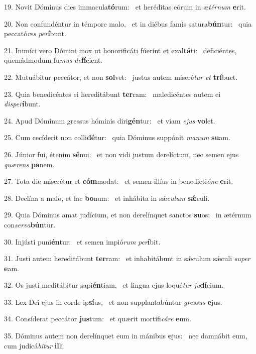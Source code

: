 19. Novit Dóminus dies immacula\textbf{tó}rum: \ast\  et heréditas eórum in æ\textit{tér}\textit{num} \textbf{e}rit.\

20. Non confundéntur in témpore malo, \dag\  et in diébus famis satura\textbf{bún}tur: \ast\  quia peccató\textit{res} \textit{per}\textbf{í}bunt.\

21. Inimíci vero Dómini mox ut honorificáti fúerint et exal\textbf{tá}ti: \ast\  deficiéntes, quemádmodum fu\textit{mus} \textit{de}\textbf{fí}cient.\

22. Mutuábitur peccátor, et non \textbf{sol}vet: \ast\  justus autem miseré\textit{tur} \textit{et} \textbf{trí}buet.\

23. Quia benedicéntes ei hereditábunt \textbf{ter}ram: \ast\  maledicéntes autem ei \textit{dis}\textit{per}\textbf{í}bunt.\

24. Apud Dóminum gressus hóminis diri\textbf{gén}tur: \ast\  et viam \textit{e}\textit{jus} \textbf{vo}let.\

25. Cum cecíderit non colli\textbf{dé}tur: \ast\  quia Dóminus suppónit \textit{ma}\textit{num} \textbf{su}am.\

26. Júnior fui, étenim \textbf{sé}nui: \ast\  et non vidi justum derelíctum, nec semen ejus \textit{quæ}\textit{rens} \textbf{pa}nem.\

27. Tota die miserétur et \textbf{cóm}modat: \ast\  et semen illíus in benedicti\textit{ó}\textit{ne} \textbf{e}rit.\

28. Declína a malo, et fac \textbf{bo}num: \ast\  et inhábita in sǽ\textit{cu}\textit{lum} \textbf{sǽ}culi.\

29. Quia Dóminus amat judícium, et non derelínquet sanctos \textbf{su}os: \ast\  in ætérnum con\textit{ser}\textit{va}\textbf{bún}tur.\

30. Injústi puni\textbf{én}tur: \ast\  et semen impió\textit{rum} \textit{per}\textbf{í}bit.\

31. Justi autem hereditábunt \textbf{ter}ram: \ast\  et inhabitábunt in sǽculum sǽculi \textit{su}\textit{per} \textbf{e}am.\

32. Os justi meditábitur sapi\textbf{én}tiam, \ast\  et lingua ejus loqué\textit{tur} \textit{ju}\textbf{dí}cium.\

33. Lex Dei ejus in corde ip\textbf{sí}us, \ast\  et non supplantabúntur \textit{gres}\textit{sus} \textbf{e}jus.\

34. Consíderat peccátor \textbf{jus}tum: \ast\  et quærit mortifi\textit{cá}\textit{re} \textbf{e}um.\

35. Dóminus autem non derelínquet eum in mánibus \textbf{e}jus: \ast\  nec damnábit eum, cum judicá\textit{bi}\textit{tur} \textbf{il}li.\

